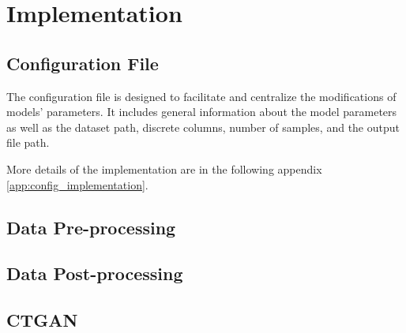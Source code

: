 \chapter{Implementation}
\label{ch:implementation}


\section{Configuration File}

The configuration file is designed to facilitate and centralize the modifications of models' parameters. It includes general information about the model parameters as well as the dataset path, discrete columns, number of samples, and the output file path.

More details of the implementation are in the following appendix \ref{app:config_implementation}.

\section{Data Pre-processing}

\section{Data Post-processing}


\vspace{0.5cm}
\section{CTGAN}









